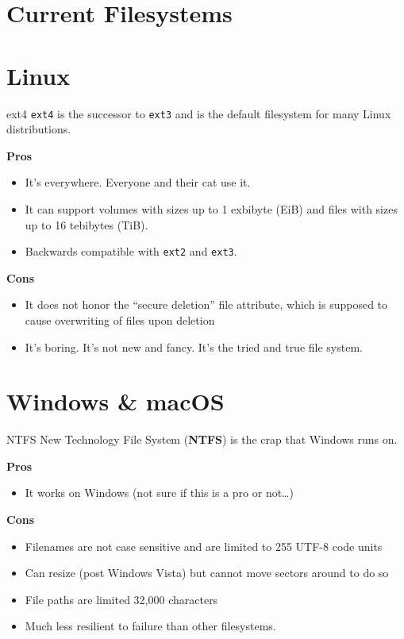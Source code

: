 \documentclass{lug}
\begin{document}
\section{Current Filesystems}

\section{Linux}
\begin{frame}{ext4}
    \texttt{ext4} is the successor to \texttt{ext3} and is the default
    filesystem for many Linux distributions.

    \textbf{Pros}
    \begin{itemize}
        \item It's everywhere. Everyone and their cat use it.
        \item It can support volumes with sizes up to 1 exbibyte (EiB) and files
            with sizes up to 16 tebibytes (TiB).
        \item Backwards compatible with \texttt{ext2} and \texttt{ext3}.
    \end{itemize}

    \textbf{Cons}
    \begin{itemize}
        \item It does not honor the ``secure deletion'' file attribute, which is
            supposed to cause overwriting of files upon deletion
        \item It's boring. It's not new and fancy. It's the tried and true file
            system.
    \end{itemize}
\end{frame}

\section{Windows \& macOS}
\begin{frame}{NTFS}
    New Technology File System (\textbf{NTFS}) is the crap that Windows runs on.

    \textbf{Pros}
    \begin{itemize}
        \item It works on Windows (not sure if this is a pro or not\ldots)
    \end{itemize}

    \textbf{Cons}
    \begin{itemize}
        \item Filenames are not case sensitive and are limited to 255 UTF-8 code
            units
        \item Can resize (post Windows Vista) but cannot move sectors around to
            do so
        \item File paths are limited 32,000 characters
        \item Much less resilient to failure than other filesystems.
    \end{itemize}
\end{frame}
\end{document}
